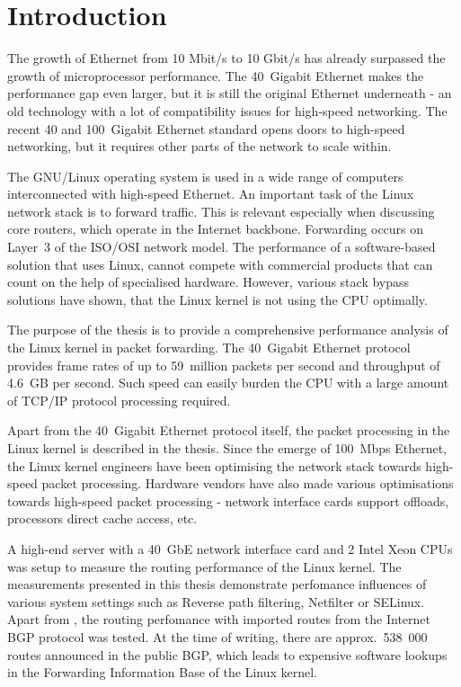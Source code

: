 
\chapter{Introduction}
The growth of Ethernet from 10 Mbit/s to 10 Gbit/s has already surpassed
the growth of microprocessor performance.
The 40~Gigabit Ethernet makes the performance gap even larger, but
it is still the original Ethernet underneath - an old technology
with a lot of compatibility issues for high-speed networking.
The recent 40 and 100~Gigabit Ethernet standard opens doors to
high-speed networking, but it requires other parts of the network to scale within.

The GNU/Linux operating system is used in a wide range of computers interconnected with high-speed Ethernet.
An important task of the Linux network stack is to forward traffic.
This is relevant especially when discussing core routers, which operate in the Internet backbone.
Forwarding occurs on Layer~3 of the ISO/OSI network model.
The performance of a software-based solution that uses Linux, cannot compete
with commercial products that can count on the help of specialised hardware.
However, various stack bypass solutions have shown, that the Linux kernel is not using
the CPU optimally.

The purpose of the thesis is to provide a comprehensive performance analysis of the Linux kernel
in packet forwarding.
The 40~Gigabit Ethernet protocol provides
frame rates of up to 59~million packets per second
and throughput of 4.6~GB per second.
Such speed can easily burden the CPU with a large amount of TCP/IP protocol processing required.

Apart from the 40~Gigabit Ethernet protocol itself,
the packet processing in the Linux kernel is described in the thesis.
Since the emerge of 100~Mbps Ethernet, the Linux kernel
engineers have been optimising the network stack towards high-speed packet processing.
Hardware vendors have also made various optimisations towards high-speed packet processing -
network interface cards support offloads, processors direct cache access, etc.





A high-end server with a 40~GbE network interface card
and 2 Intel Xeon CPUs was setup to measure the routing performance of the Linux kernel.
The measurements presented in this thesis demonstrate perfomance influences of various system settings
such as Reverse path filtering, Netfilter or SELinux.
Apart from ,
the routing perfomance with imported routes from the Internet BGP protocol was tested.
At the time of writing, there are approx.~538~000 routes announced in the public BGP,
which leads to expensive software lookups in the Forwarding Information Base of the Linux kernel.


